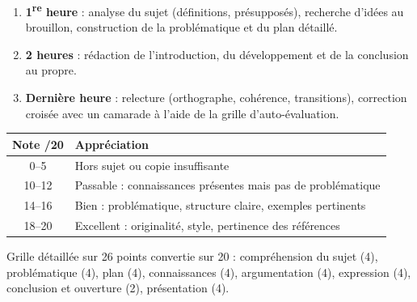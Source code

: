 \documentclass[11pt]{article}
\begin{document}
\begin{methode}
\begin{enumerate}
\item \textbf{1\textsuperscript{re} heure} : analyse du sujet (définitions, présupposés), recherche d'idées au brouillon, construction de la problématique et du plan détaillé.
\item \textbf{2 heures} : rédaction de l'introduction, du développement et de la conclusion au propre.
\item \textbf{Dernière heure} : relecture (orthographe, cohérence, transitions), correction croisée avec un camarade à l'aide de la grille d'auto-évaluation.
\end{enumerate}
\end{methode}

\begin{exemplebox}
\begin{center}
\begin{tabularx}{\linewidth}{|c|X|}\hline
\rowcolor{popblueL} \textbf{Note /20} & \textbf{Appréciation} \\ \hline
0--5 & Hors sujet ou copie insuffisante \\ \hline
10--12 & Passable : connaissances présentes mais pas de problématique \\ \hline
14--16 & Bien : problématique, structure claire, exemples pertinents \\ \hline
18--20 & Excellent : originalité, style, pertinence des références \\ \hline
\end{tabularx}
\end{center}
Grille détaillée sur 26 points convertie sur 20 : compréhension du sujet (4), problématique (4), plan (4), connaissances (4), argumentation (4), expression (4), conclusion et ouverture (2), présentation (4).
\end{exemplebox}
\end{document}
